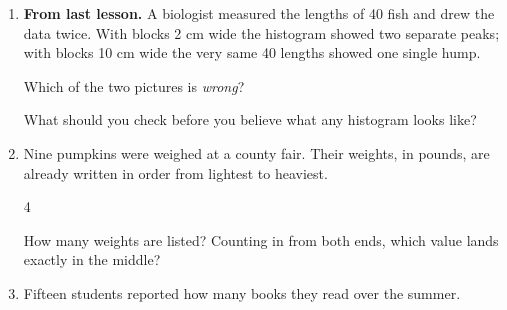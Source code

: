 \documentclass[12pt]{article}
\begin{document}

\vspace{0.20in}

\begin{enumerate}[leftmargin=1.9em, itemsep=0.42in]

  \item \textbf{From last lesson.} A biologist measured the lengths of 40 fish and drew the
        data twice. With blocks 2 cm wide the histogram showed two separate peaks; with blocks
        10 cm wide the very same 40 lengths showed one single hump.

        \vspace{10pt}
        Which of the two pictures is \emph{wrong}? 

        \vspace{14pt}
        What should you check before you believe what any histogram looks like?

  \item Nine pumpkins were weighed at a county fair. Their weights, in pounds, are already
        written in order from lightest to heaviest.

        \vspace{10pt}
        \begin{center}
        4        
        \end{center}
        \vspace{10pt}

        How many weights are listed?  \qquad
        Counting in from both ends, which value lands exactly in the middle? 

  \item Fifteen students reported how many books they read over the summer.

        \vspace{4pt}
        \begin{center}
        \end{center}
        \vspace{4pt}


\end{enumerate}
\end{document}
